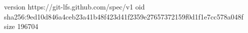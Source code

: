 version https://git-lfs.github.com/spec/v1
oid sha256:9ed10d846a4ceb23a41b48f423d41f2359e27657372159f0d1f1e7cc578a048f
size 196704
